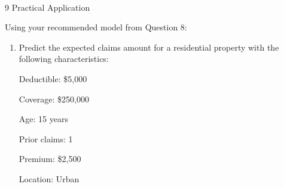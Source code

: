 \documentclass[8pt, twocolumn]{extarticle}
\providecommand{\tightlist}{%
      \setlength{\itemsep}{0pt}\setlength{\parskip}{0pt}}
\begin{document}
    \begin{center}
    \end{center}
    { \hspace*{\fill} \\}
    
    9 Practical Application

Using your recommended model from Question 8:

    \begin{enumerate}
\def\labelenumi{(\alph{enumi})}
\tightlist
\item
  Predict the expected claims amount for a residential property with the
  following characteristics:

  Deductible: \$5,000

  Coverage: \$250,000

  Age: 15 years

  Prior claims: 1

  Premium: \$2,500

  Location: Urban
\end{enumerate}
\end{document}
